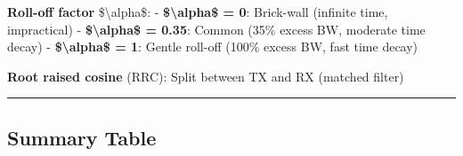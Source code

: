 \textbf{Roll-off factor} \$\textbackslash alpha\$: -
\textbf{\$\textbackslash alpha\$ = 0}: Brick-wall (infinite time,
impractical) - \textbf{\$\textbackslash alpha\$ = 0.35}: Common (35\%
excess BW, moderate time decay) - \textbf{\$\textbackslash alpha\$ = 1}:
Gentle roll-off (100\% excess BW, fast time decay)

\textbf{Root raised cosine} (RRC): Split between TX and RX (matched
filter)

\begin{center}\rule{0.5\linewidth}{0.5pt}\end{center}

\subsection{Summary Table}\label{summary-table}

